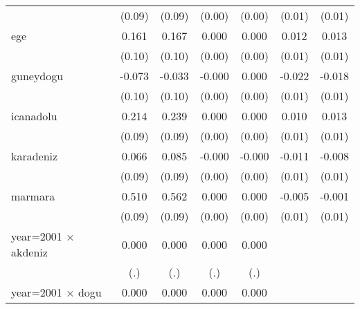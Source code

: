 {\begin{tabular}{l*{6}{c}}
                    &      (0.09)         &      (0.09)         &      (0.00)         &      (0.00)         &      (0.01)         &      (0.01)         \\
ege                 &       0.161         &       0.167         &       0.000         &       0.000         &       0.012         &       0.013         \\
                    &      (0.10)         &      (0.10)         &      (0.00)         &      (0.00)         &      (0.01)         &      (0.01)         \\
guneydogu           &      -0.073         &      -0.033         &      -0.000         &       0.000         &      -0.022\sym{**} &      -0.018\sym{*}  \\
                    &      (0.10)         &      (0.10)         &      (0.00)         &      (0.00)         &      (0.01)         &      (0.01)         \\
icanadolu           &       0.214\sym{*}  &       0.239\sym{**} &       0.000         &       0.000         &       0.010         &       0.013         \\
                    &      (0.09)         &      (0.09)         &      (0.00)         &      (0.00)         &      (0.01)         &      (0.01)         \\
karadeniz           &       0.066         &       0.085         &      -0.000         &      -0.000         &      -0.011         &      -0.008         \\
                    &      (0.09)         &      (0.09)         &      (0.00)         &      (0.00)         &      (0.01)         &      (0.01)         \\
marmara             &       0.510\sym{***}&       0.562\sym{***}&       0.000         &       0.000         &      -0.005         &      -0.001         \\
                    &      (0.09)         &      (0.09)         &      (0.00)         &      (0.00)         &      (0.01)         &      (0.01)         \\
year=2001 $\times$ akdeniz&       0.000         &       0.000         &       0.000         &       0.000         &                     &                     \\
                    &         (.)         &         (.)         &         (.)         &         (.)         &                     &                     \\
year=2001 $\times$ dogu&       0.000         &       0.000         &       0.000         &       0.000         &                     &                     \\

\end{tabular}}

